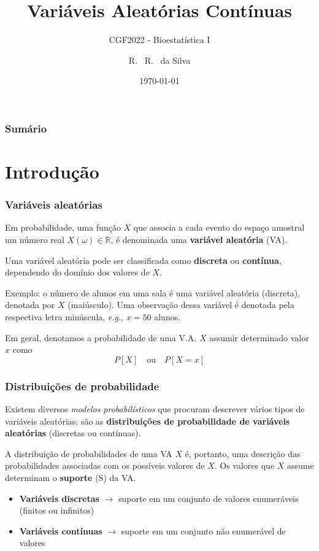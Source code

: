 \documentclass[11pt]{beamer}
\title[Bioestatística II] %
{Variáveis Aleatórias Contínuas}
\subtitle{CGF2022 - Bioestatística I}
\author[da Silva, Ricardo] %
{R. ~R. ~da Silva\inst{1}}
\institute[FCFRP] %
{
  \inst{1}%
  Departamento de Ciências BioMoleculares\\
  Faculdade de Ciências Farmacêuticas

}
\date{\today} %
\begin{document}
\begin{frame}
\titlepage
\end{frame}

\begin{frame}
\label{contents}
\frametitle{Sumário}
\tableofcontents
\end{frame}

\section{Introdução}
\begin{frame}
\frametitle{Variáveis aleatórias}

Em probabilidade, uma função \(X\) que associa a cada evento do espaço
amostral um número real \(X(\omega) \in \mathbb{R}\), é denominada uma
\textbf{variável aleatória} (VA).

Uma variável aleatória pode ser classificada como \textbf{discreta} ou
\textbf{contínua}, dependendo do domínio dos valores de \(X\).

Exemplo: o número de alunos em uma sala é uma variável aleatória
(discreta), denotada por \(X\) (maiúsculo). Uma observação dessa
variável é denotada pela respectiva letra minúscula, \emph{e.g.},
\(x = 50\) alunos.

Em geral, denotamos a probabilidade de uma V.A. \(X\) assumir
determinado valor \(x\) como \[
P[X] \quad \text{ou} \quad P[X = x]
\]


\end{frame}

\begin{frame}
\frametitle{Distribuições de probabilidade}

Existem diversos \emph{modelos probabilísticos} que procuram descrever
vários tipos de variáveis aleatórias: são as \textbf{distribuições de
probabilidade de variáveis aleatórias} (discretas ou contínuas).

A distribuição de probabilidades de uma VA \(X\) é, portanto, uma
descrição das probabilidades associadas com os possíveis valores de
\(X\). Os valores que \(X\) assume determinam o \textbf{suporte} (S) da
VA.

\begin{itemize}
\item
  \textbf{Variáveis discretas} \(\rightarrow\) suporte em um conjunto de
  valores enumeráveis (finitos ou infinitos)
\item
  \textbf{Variáveis contínuas} \(\rightarrow\) suporte em um conjunto
  não enumerável de valores
\end{itemize}
\end{frame}
\end{document}
